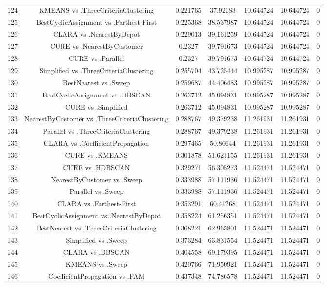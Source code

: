 \documentclass[a4paper,10pt]{article}
\begin{document}
\begin{landscape}
\begin{table}[!htp]
\begin{tabular}{ccccccc}
124&KMEANS vs .ThreeCriteriaClustering&0.221765&37.92183&10.644724&10.644724&0\\
125&BestCyclicAssignment vs .Farthest-First&0.225368&38.537987&10.644724&10.644724&0\\
126&CLARA vs .NearestByDepot&0.229013&39.161259&10.644724&10.644724&0\\
127&CURE vs .NearestByCustomer&0.2327&39.791673&10.644724&10.644724&0\\
128&CURE vs .Parallel&0.2327&39.791673&10.644724&10.644724&0\\
129&Simplified vs .ThreeCriteriaClustering&0.255704&43.725444&10.995287&10.995287&0\\
130&BestNearest vs .Sweep&0.259687&44.406483&10.995287&10.995287&0\\
131&BestCyclicAssignment vs .DBSCAN&0.263712&45.094831&10.995287&10.995287&0\\
132&CURE vs .Simplified&0.263712&45.094831&10.995287&10.995287&0\\
133&NearestByCustomer vs .ThreeCriteriaClustering&0.288767&49.379238&11.261931&11.261931&0\\
134&Parallel vs .ThreeCriteriaClustering&0.288767&49.379238&11.261931&11.261931&0\\
135&CLARA vs .CoefficientPropagation&0.297465&50.86644&11.261931&11.261931&0\\
136&CURE vs .KMEANS&0.301878&51.621155&11.261931&11.261931&0\\
137&CURE vs .HDBSCAN&0.329271&56.305273&11.524471&11.524471&0\\
138&NearestByCustomer vs .Sweep&0.333988&57.111936&11.524471&11.524471&0\\
139&Parallel vs .Sweep&0.333988&57.111936&11.524471&11.524471&0\\
140&CLARA vs .Farthest-First&0.353291&60.41268&11.524471&11.524471&0\\
141&BestCyclicAssignment vs .NearestByDepot&0.358224&61.256351&11.524471&11.524471&0\\
142&BestNearest vs .ThreeCriteriaClustering&0.368221&62.965801&11.524471&11.524471&0\\
143&Simplified vs .Sweep&0.373284&63.831554&11.524471&11.524471&0\\
144&CLARA vs .DBSCAN&0.404558&69.179395&11.524471&11.524471&0\\
145&KMEANS vs .Sweep&0.420766&71.950921&11.524471&11.524471&0\\
146&CoefficientPropagation vs .PAM&0.437348&74.786578&11.524471&11.524471&0\\

\end{tabular}
\end{table}
\end{landscape}
\end{document}
